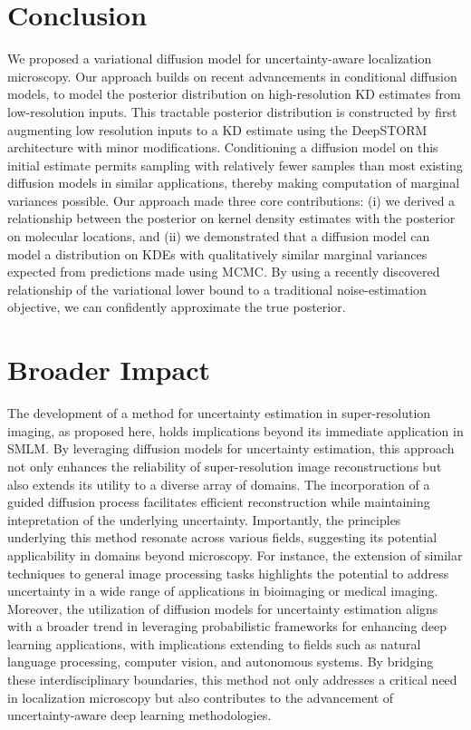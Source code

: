\documentclass{article}
\begin{document}
\section{Conclusion}

We proposed a variational diffusion model for uncertainty-aware localization microscopy. Our approach builds on recent advancements in conditional diffusion models, to model the posterior distribution on high-resolution KD estimates from low-resolution inputs. This tractable posterior distribution is constructed by first augmenting low resolution inputs to a KD estimate using the DeepSTORM architecture \citep{Nehme2020} with minor modifications. Conditioning a diffusion model on this initial estimate permits sampling with relatively fewer samples than most existing diffusion models in similar applications, thereby making computation of marginal variances possible. Our approach made three core contributions: (i) we derived a relationship between the posterior on kernel density estimates with the posterior on molecular locations, and (ii) we demonstrated that a diffusion model can model a distribution on KDEs with qualitatively similar marginal variances expected from predictions made using MCMC. By using a recently discovered relationship of the variational lower bound to a traditional noise-estimation objective, we can confidently approximate the true posterior.

\section{Broader Impact}

The development of a method for uncertainty estimation in super-resolution imaging, as proposed here, holds implications beyond its immediate application in SMLM. By leveraging diffusion models for uncertainty estimation, this approach not only enhances the reliability of super-resolution image reconstructions but also extends its utility to a diverse array of domains. The incorporation of a guided diffusion process facilitates efficient reconstruction while maintaining intepretation of the underlying uncertainty. Importantly, the principles underlying this method resonate across various fields, suggesting its potential applicability in domains beyond microscopy. For instance, the extension of similar techniques to general image processing tasks highlights the potential to address uncertainty in a wide range of applications in bioimaging or medical imaging. Moreover, the utilization of diffusion models for uncertainty estimation aligns with a broader trend in leveraging probabilistic frameworks for enhancing deep learning applications, with implications extending to fields such as natural language processing, computer vision, and autonomous systems. By bridging these interdisciplinary boundaries, this method not only addresses a critical need in localization microscopy but also contributes to the advancement of uncertainty-aware deep learning methodologies.
\end{document}

